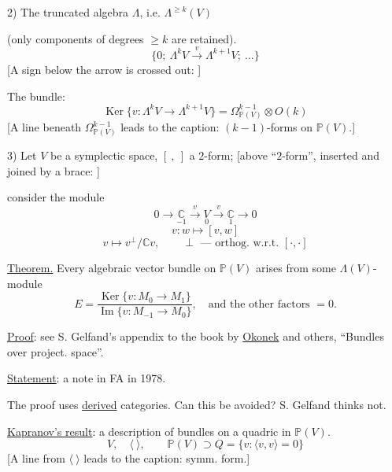 2) The truncated algebra $\Lambda$, i.e. $\Lambda^{\ge k}(V)$

(only components of degrees $\ge k$ are retained).
\begin{equation*}
\{0;\ \Lambda^kV\overset{v}{\longrightarrow}\Lambda^{k+1}V;\ \ldots\}
\end{equation*}
[A sign below the arrow is crossed out:
]

The bundle:
\begin{equation*}
\operatorname{Ker}\{v:\Lambda^kV\to\Lambda^{k+1}V\}
=\Omega^{k-1}_{\mathbb P(V)}\otimes O(k)
\end{equation*}
[A line beneath $\Omega^{k-1}_{\mathbb P(V)}$ leads to the caption:
$(k-1)$-forms on $\mathbb P(V)$.]

3) Let $V$ be a symplectic space, $[\ ,\ ]$ a $2$-form;
[above “$2$-form”, inserted and joined by a brace:
]

consider the module
\begin{equation*}
0\to\underset{-1}{\mathbb C}\overset{v}{\longrightarrow}
\underset{0}{V}\overset{v}{\longrightarrow}\underset{1}{\mathbb C}\to0
\end{equation*}
\begin{equation*}
v:w\longmapsto[v,w]
\end{equation*}
\begin{equation*}
v\longmapsto v^{\perp}/\mathbb Cv,
\qquad\perp\text{ --- orthog. w.r.t. }[\cdot,\cdot]
\end{equation*}

\underline{Theorem.} Every algebraic vector bundle
on $\mathbb P(V)$ arises from some $\Lambda(V)$-module
\begin{equation*}
E=\frac{\operatorname{Ker}\{v:M_0\to M_1\}}
{\operatorname{Im}\{v:M_{-1}\to M_0\}},
\quad\text{and the other factors }=0.
\end{equation*}

\underline{Proof}: see S. Gelfand's appendix
to the book by \underline{Okonek} and others, “Bundles over project. space”.

\underline{Statement}: a note in FA in 1978.

The proof uses \underline{derived} categories. Can this
be avoided? S. Gelfand thinks not.

\underline{Kapranov's result}: a description of bundles on a quadric
in $\mathbb P(V)$.
\begin{equation*}
V,\quad\langle\ \rangle,\qquad
\mathbb P(V)\supset Q=\{v:\langle v,v\rangle=0\}
\end{equation*}
[A line from $\langle\ \rangle$ leads to the caption: symm. form.]

